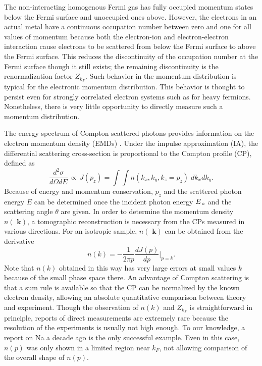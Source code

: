 \documentclass[twocolumn,showpacs,showkeys,fleqn,prl,superscriptaddress]{revtex4}%
\newcommand{\bb}[1]{\textbf{ #1}}
\newcommand{\nn}[1]{\textnormal{ #1}}
\begin{document}
The non-interacting homogenous Fermi gas has fully occupied momentum states below the  Fermi surface and unoccupied ones above. 
However, the electrons in an actual metal have a continuous occupation number between zero and one for all values of momentum because both the electron-ion and electron-electron interaction cause electrons to be scattered from below the Fermi surface to above the Fermi surface. This reduces the discontinuity of the occupation number at the Fermi surface though it still exists; the remaining discontinuity is the renormalization factor $Z_{k_F}$.  Such behavior in the momentum distribution is typical for the electronic momentum distribution.
This behavior is thought to persist even for strongly correlated electron systems such as for heavy fermions.         
Nonetheless, there is very little opportunity to   directly measure such a momentum distribution.

The energy spectrum of Compton scattered photons provides information on the  electron momentum density (EMDs) \cite{sch}.
Under the impulse approximation (IA)\cite{eisen70,kaplan03}, the differential scattering cross-section is proportional to the Compton profile (CP),  defined as
\begin{equation}
\frac{d^2\sigma}{d\Omega dE} \,\propto \, J(p_z) = \int \!\! \int n(k_x,k_y,k_z\!=\!p_z) \;dk_x dk_y .
\end{equation}
Because of energy and momentum conservation, $p_z$ and the scattered photon energy $E$ can be determined once the incident photon energy $E_{\nn{\!o}}$ and the scattering angle $\theta$ are given.  
In order to determine the momentum density $n(\!\!\bb{k})$, a tomographic reconstruction is necessary from the CPs measured in various directions.
For an isotropic sample, $n(\!\!\bb{k})$ can be obtained from the derivative
\begin{equation}
n(k) = - \frac{1}{2 \pi p} \frac{d J(p)}{d p}  | _{p=k}   .
\end{equation}
Note that $n(k)$ obtained in this way has very large errors at small values $k$ because of the small phase space there.  
An advantage of Compton scattering is that a sum rule is available so that the CP can be normalized by the known electron density, allowing an absolute quantitative comparison between theory and experiment.
Though the observation of $n(k)$ and $Z_{k_F}$ is straightforward in principle, reports of direct measurements are extremely rare because the resolution of the experiments is usually not high enough.
To our knowledge, a report on Na a decade ago is the only successful example\cite{simo10}.
Even in this case, $n(p)$ was only shown in a limited region near $k_F$, not allowing comparison of the overall shape of $n(p)$.
\end{document}
